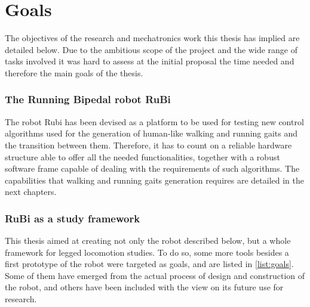 \section{Goals}
\label{sec:goals}
The objectives of the research and mechatronics work this thesis has implied are detailed below.
Due to the ambitious scope of the project and the wide range of tasks involved it was hard to assess at the initial proposal the time needed and therefore the main goals of the thesis. 

\subsubsection{The Running Bipedal robot RuBi} %
\label{ssub:the_running_bipedal_robot_rubi}
The robot Rubi has been devised as a platform to be used for testing new control algorithms used for the generation of human-like walking and running gaits and the transition between them.
Therefore, it has to count on a reliable hardware structure able to offer all the needed functionalities, together with a robust software frame capable of dealing with the requirements of such algorithms.
The capabilities that walking and running gaits generation requires are detailed in the next chapters.


\subsubsection{RuBi as a study framework} %
\label{ssub:rubi_as_a_study_framework}
This thesis aimed at creating not only the robot described below, but a whole framework for legged locomotion studies.
To do so, some more tools besides a first prototype of the robot were targeted as goals, and are listed in \ref{list:goals}.
Some of them have emerged from the actual process of design and construction of the robot, and others have been included with the view on its future use for research.

